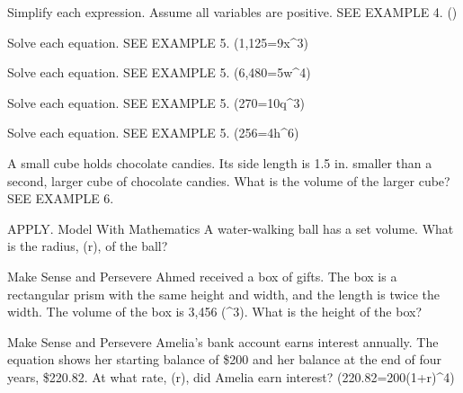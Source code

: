 \documentclass{article}
\newenvironment{practice}[2]{}{}        %
\newcommand{\answer}[1]{}               %
\newcommand{\placeholder}[2]{}          %
\begin{document}
\begin{practice}{38}{1}
Simplify each expression. Assume all variables are positive. SEE EXAMPLE 4.
()
\answer{(vg^5)}
\end{practice}
\begin{practice}{39}{1}
Solve each equation. SEE EXAMPLE 5.
(1,125=9x^3)
\answer{5}
\end{practice}
\begin{practice}{40}{1}
Solve each equation. SEE EXAMPLE 5.
(6,480=5w^4)
\answer{(\pm6)}
\end{practice}
\begin{practice}{41}{1}
Solve each equation. SEE EXAMPLE 5.
(270=10q^3)
\answer{3}
\end{practice}
\begin{practice}{42}{1}
Solve each equation. SEE EXAMPLE 5.
(256=4h^6)
\answer{(\pm2)}
\end{practice}
\begin{practice}{43}{2}
A small cube holds chocolate candies. Its side length is 1.5 in. smaller than a second, larger cube of chocolate candies. What is the volume of the larger cube? SEE EXAMPLE 6.
\placeholder{illustration}{Two cubic chocolate boxes: smaller Dark Chocolate box with callout Volume is (85\text{ in.}^3); larger Milk Chocolate box.}
\answer{(\approx205\text{ in.}^3)}
\end{practice}
\begin{practice}{44}{2}
APPLY. Model With Mathematics A water-walking ball has a set volume. What is the radius, (r), of the ball?
\placeholder{illustration}{Person inside a clear spherical water-walking ball on water, with a city skyline behind. Label: Volume (\approx4.19\text{ m}^3).}
\answer{1 m}
\end{practice}
\begin{practice}{45}{2}
Make Sense and Persevere Ahmed received a box of gifts. The box is a rectangular prism with the same height and width, and the length is twice the width. The volume of the box is 3,456 (^3). What is the height of the box?
\placeholder{illustration}{Rectangular prism labeled Mystery Box, containing gifts; dimensions (2x) in. along the length, (x) in. along the width and (x) in. along the height.}
\answer{12 in.}
\end{practice}
\begin{practice}{46}{2}
Make Sense and Persevere Amelia's bank account earns interest annually. The equation shows her starting balance of \$200 and her balance at the end of four years, \$220.82. At what rate, (r), did Amelia earn interest?
(220.82=200(1+r)^4)
\answer{0.025 or 2.5\%}
\end{practice}
\end{document}

